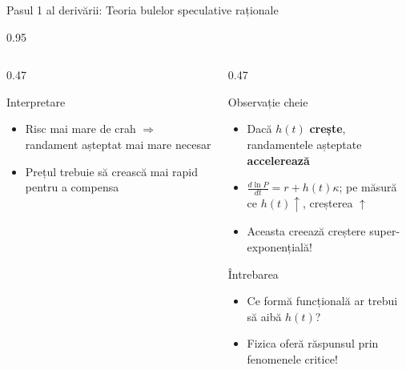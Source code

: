 \documentclass[9pt, aspectratio=169, t]{beamer}
\begin{document}
\begin{frame}{Pasul 1 al derivării: Teoria bulelor speculative raționale}
\begin{cminipage}{0.95\textwidth}
{\begin{columns}[T]
\begin{column}{0.47\textwidth}
            \begin{exampleblock}{Interpretare}
                \begin{itemize}\setlength{\itemsep}{0pt}
                    \item Risc mai mare de crah $\Rightarrow$ randament așteptat mai mare necesar
                    \item Prețul trebuie să crească mai rapid pentru a compensa
                \end{itemize}
            \end{exampleblock}
        \end{column}
        \begin{column}{0.47\textwidth}
            \begin{alertblock}{Observație cheie}
                \begin{itemize}\setlength{\itemsep}{0pt}
                    \item Dacă $h(t)$ \textbf{crește}, randamentele așteptate \textbf{accelerează}
                    \item $\frac{d\ln P}{dt} = r + h(t)\kappa$; pe măsură ce $h(t) \uparrow$, creșterea $\uparrow$
                    \item Aceasta creează creștere super-exponențială!
                \end{itemize}
            \end{alertblock}

            \begin{block}{Întrebarea}
                \begin{itemize}\setlength{\itemsep}{0pt}
                    \item Ce formă funcțională ar trebui să aibă $h(t)$?
                    \item Fizica oferă răspunsul prin fenomenele critice!
                \end{itemize}
            \end{block}
        \end{column}
    \end{columns}
    }
    \end{cminipage}
\end{frame}
\end{document}
